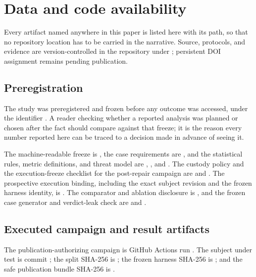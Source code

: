 \section{Data and code availability}
\label{sec:availability}

Every artifact named anywhere in this paper is listed here with its path, so that no repository location has to be carried in the narrative. Source, protocols, and evidence are version-controlled in the  repository under ; persistent DOI assignment remains pending publication.

\subsection{Preregistration}
The study was preregistered and frozen before any outcome was accessed, under the identifier . A reader checking whether a reported analysis was planned or chosen after the fact should compare against that freeze; it is the reason every number reported here can be traced to a decision made in advance of seeing it.

The machine-readable freeze is , the case requirements are , and the statistical rules, metric definitions, and threat model are , , and . The custody policy and the execution-freeze checklist for the post-repair campaign are  and . The prospective execution binding, including the exact subject revision and the frozen harness identity, is . The comparator and ablation disclosure is , and the frozen case generator and verdict-leak check are  and .

\subsection{Executed campaign and result artifacts}
The publication-authorizing campaign is GitHub Actions run . The subject under test is commit ; the split SHA-256 is
; the frozen harness SHA-256 is
; and the safe publication bundle SHA-256 is
.


